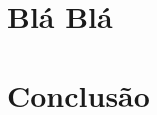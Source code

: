 \documentclass[times, 10pt,twocolumn]{article}
\begin{document}





\section{Blá Blá}

\section{Conclusão}


\nocite{ex1,ex2}
%


\end{document}
